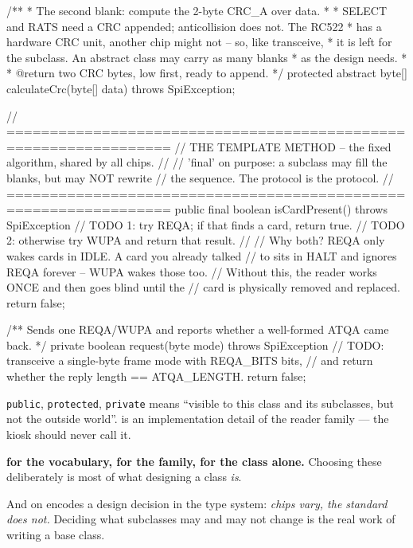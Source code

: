 \begin{jcode}
{    /**
     * The second blank: compute the 2-byte CRC_A over data.
     *
     * SELECT and RATS need a CRC appended; anticollision does not. The RC522
     * has a hardware CRC unit, another chip might not -- so, like transceive,
     * it is left for the subclass. An abstract class may carry as many blanks
     * as the design needs.
     *
     * @return two CRC bytes, low first, ready to append.
     */
    protected abstract byte[] calculateCrc(byte[] data) throws SpiException;

    // =================================================================
    // THE TEMPLATE METHOD -- the fixed algorithm, shared by all chips.
    //
    // 'final' on purpose: a subclass may fill the blanks, but may NOT rewrite
    // the sequence. The protocol is the protocol.
    // =================================================================
    public final boolean isCardPresent() throws SpiException {
        // TODO 1: try REQA; if that finds a card, return true.
        // TODO 2: otherwise try WUPA and return that result.
        //
        //   Why both? REQA only wakes cards in IDLE. A card you already talked
        //   to sits in HALT and ignores REQA forever -- WUPA wakes those too.
        //   Without this, the reader works ONCE and then goes blind until the
        //   card is physically removed and replaced.
        return false;
    }

    /** Sends one REQA/WUPA and reports whether a well-formed ATQA came back. */
    private boolean request(byte mode) throws SpiException {
        // TODO: transceive a single-byte frame { mode } with REQA_BITS bits,
        //       and return whether the reply length == ATQA_LENGTH.
        return false;
    }
}
\end{jcode}

\begin{concept}{\texttt{public}, \texttt{protected}, \texttt{private}}
 means ``visible to this class and its subclasses, but not the
outside world''.  is an implementation detail of the reader
family --- the kiosk should never call it.

\textbf{ for the vocabulary,  for the family,
 for the class alone.} Choosing these deliberately is most of what
designing a class \emph{is}.

And  on  encodes a design decision in the type
system: \emph{chips vary, the standard does not.} Deciding what subclasses may
and may not change is the real work of writing a base class.
\end{concept}

